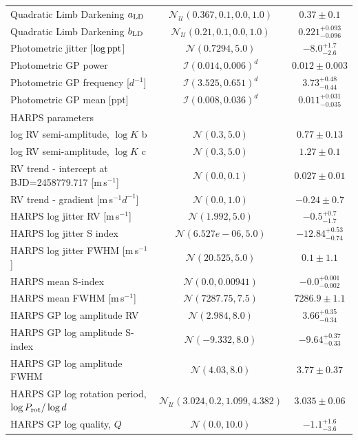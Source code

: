 \documentclass[fleqn,usenatbib]{mnras}
\newcommand{\harps}{{HARPS}}
\newcommand{\ms}{m\,s$^{-1}$}
\newcommand{\TlogKzero}{ $ 0.77 \pm 0.13 $ }
\newcommand{\TlogKone}{ $ 1.27 \pm 0.1 $ }
\newcommand{\Trvlogerrcontrzero}{ $ -0.5^{+0.7}_{-1.7} $ }
\newcommand{\Trvlogerrcontrone}{ $ -12.84^{+0.53}_{-0.74} $ }
\newcommand{\Trvlogerrcontrtwo}{ $ 0.1 \pm 1.1 $ }
\newcommand{\Tphotlogerrcontr}{ $ -8.0^{+1.7}_{-2.6} $ }
\newcommand{\Tmeans}{ $ -0.0^{+0.001}_{-0.002} $ }
\newcommand{\Tmeanfwhm}{ $ 7286.9 \pm 1.1 $ }
\newcommand{\Tlogamprv}{ $ 3.66^{+0.35}_{-0.34} $ }
\newcommand{\Tlogamps}{ $ -9.64^{+0.37}_{-0.33} $ }
\newcommand{\Tlogampfwhm}{ $ 3.77 \pm 0.37 $ }
\newcommand{\TlogQzero}{ $ -1.1^{+1.6}_{-3.6} $ }
\newcommand{\Tlogperiod}{ $ 3.035 \pm 0.06 $ }
\newcommand{\TphotSzero}{ $ 0.012 \pm 0.003 $ }
\newcommand{\Tphotwzero}{ $ 3.73^{+0.48}_{-0.44} $ }
\newcommand{\Tphotmean}{ $ 0.011^{+0.031}_{-0.035} $ }
\newcommand{\Trvtrendzero}{ $ 0.027 \pm 0.01 $ }
\newcommand{\Trvtrendone}{ $ -0.24 \pm 0.7 $ }
\newcommand{\Tustartesszero}{ $ 0.37 \pm 0.1 $ }
\newcommand{\Tustartessone}{ $ 0.221^{+0.093}_{-0.096} $ }
\begin{document}
\begin{table}
\begin{center}
\begin{tabular}{lcc}
Quadratic Limb Darkening $a_{\rm LD}$ &  $\mathcal{N}_{\mathcal{U}}(0.367,0.1,0.0,1.0)$  & \Tustartesszero{}\\
Quadratic Limb Darkening $b_{\rm LD}$ &  $\mathcal{N}_{\mathcal{U}}(0.21,0.1,0.0,1.0)$  & \Tustartessone{} \\
Photometric jitter [$\log{\rm ppt}$] &  $\mathcal{N}(0.7294,5.0)$  &  \Tphotlogerrcontr{} \\
Photometric GP power & $\mathcal{I}(0.014,0.006)^{d}$  & \TphotSzero{} \\
Photometric GP frequency [$d^{-1}$] & $\mathcal{I}(3.525,0.651)^{d}$  &   \Tphotwzero{} \\
Photometric GP mean [ppt] & $\mathcal{I}(0.008,0.036)^{d}$  & \Tphotmean{} \\
\hline
\multicolumn{3}{l}{\harps{} parameters}\\
log RV semi-amplitude, $\log{K}$ b &  $\mathcal{N}(0.3,5.0)$  &   \TlogKzero{} \\
log RV semi-amplitude, $\log{K}$ c &  $\mathcal{N}(0.3,5.0)$  &   \TlogKone{} \\
RV trend - intercept at BJD=2458779.717 [\ms{}] &  $\mathcal{N}(0.0,0.1)$  & \Trvtrendzero{} \\
RV trend - gradient [\ms{}$d^{-1}$] &  $\mathcal{N}(0.0,1.0)$  &   \Trvtrendone{} \\
\harps{} log jitter RV [\ms{}] &  $\mathcal{N}(1.992,5.0)$  &   \Trvlogerrcontrzero{} \\
\harps{} log jitter S index &  $\mathcal{N}(6.527e-06,5.0)$  &  \Trvlogerrcontrone{} \\
\harps{} log jitter FWHM [\ms{}] &  $\mathcal{N}(20.525,5.0)$  &   \Trvlogerrcontrtwo{} \\
\harps{} mean S-index &  $\mathcal{N}(0.0,0.00941)$  &  \Tmeans{} \\
\harps{} mean FWHM [\ms{}] &  $\mathcal{N}(7287.75,7.5)$  &  \Tmeanfwhm{} \\
\harps{} GP log amplitude RV &  $\mathcal{N}(2.984,8.0)$  &  \Tlogamprv{} \\
\harps{} GP log amplitude S-index &  $\mathcal{N}(-9.332,8.0)$  & \Tlogamps{} \\
\harps{} GP log amplitude FWHM &  $\mathcal{N}(4.03,8.0)$  & \Tlogampfwhm{}  \\
\harps{} GP log rotation period, $\log{P_{\rm rot}}/\log{d}$ &  $\mathcal{N}_{\mathcal{U}}(3.024,0.2,1.099,4.382)$  & \Tlogperiod{} \\
\harps{} GP log quality, $Q$ &  $\mathcal{N}(0.0,10.0)$  &  \TlogQzero{} \\

\end{tabular}
\end{center}
\end{table}
\end{document}
